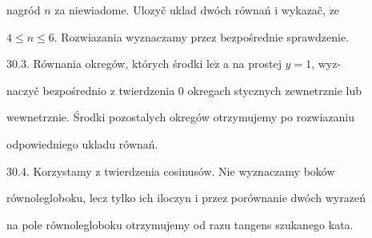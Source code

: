\documentclass[a4paper,12pt]{article}
\begin{document}
nagród $n$ za niewiadome. Ulozyč uklad dwóch równań $\mathrm{i}$ wykazač, $\dot{\mathrm{z}}\mathrm{e}$

$4\leq n\leq 6$. Rozwiazania wyznaczamy przez bezpośrednie sprawdzenie.

30.3. Równania okregów, których środki $\mathrm{l}\mathrm{e}\dot{\mathrm{z}}$ a na prostej $y = 1$, wyz-

naczyč bezpośrednio $\mathrm{z}$ twierdzenia $0$ okregach stycznych zewnetrznie lub

wewnetrznie. Środki pozostalych okregów otrzymujemy po rozwiazaniu

odpowiedniego ukladu równań.

30.4. Korzystamy $\mathrm{z}$ twierdzenia cosinusów. Nie wyznaczamy boków

równolegloboku, lecz tylko ich iloczyn $\mathrm{i}$ przez porównanie dwóch wyrazeń

na pole równolegloboku otrzymujemy od razu tangens szukanego kata.
\end{document}
